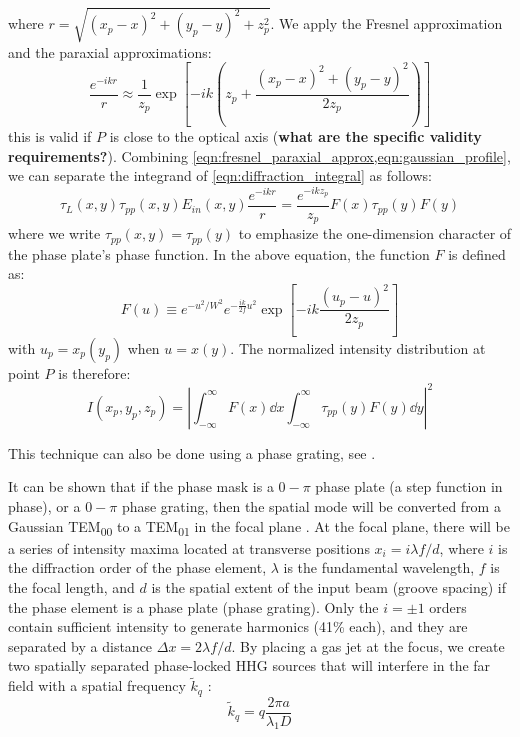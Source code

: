 where $r = \sqrt{(x_p-x)^2 + (y_p-y)^2 + z_p^2}$. We apply the Fresnel approximation and the paraxial approximations:
\begin{equation}
\frac{e^{-i k r}}{r} \approx \frac{1}{z_p} \exp \left[-ik \left(z_p + \frac{(x_p-x)^2 + (y_p-y)^2}{2z_p} \right) \right]
\label{eqn:fresnel_paraxial_approx}
\end{equation}
this is valid if $P$ is close to the optical axis (\textbf{what are the specific validity requirements?}). Combining \cref{eqn:fresnel_paraxial_approx,eqn:gaussian_profile}, we can separate the integrand of \cref{eqn:diffraction_integral} as follows:
\begin{equation}
\tau_{L}(x,y) \tau_{pp}(x,y) E_{in}(x,y) \frac{e^{-ikr}}{r} = \frac{e^{-ikz_p}}{z_p} F(x) \tau_{pp}(y) F(y)
\end{equation}
where we write ${\tau_{pp}(x,y)=\tau_{pp}(y)}$ to emphasize the one-dimension character of the phase plate's phase function. In the above equation, the function $F$ is defined as:
\begin{equation}
F(u) \equiv e^{-u^2/W^2}  e^{-\frac{ik}{2f}u^2} \exp \left[-ik \frac{(u_p-u)^2}{2 z_p}\right] 
\end{equation}
with $u_p = x_p (y_p)$ when $u = x (y)$. The normalized intensity distribution at point $P$ is therefore:
\begin{equation}
I(x_p, y_p, z_p) = \left| \int_{-\infty}^{\infty} F(x) \dd{x} \int_{-\infty}^{\infty} \tau_{pp}(y) F(y) \dd{y} \right|^2
\end{equation}



This technique can also be done using a phase grating, see \cite{hagemanComplexAttosecondTransientAbsorption2020}.

It can be shown that if the phase mask is a $0-\pi$ phase plate (a step function in phase), or a $0-\pi$ phase grating, then the spatial mode will be converted from a Gaussian TEM\textsubscript{00} to a TEM\textsubscript{01} in the focal plane \cite{hagemanComplexAttosecondTransientAbsorption2020,camperHighRelativephasePrecision2019,camperTransverseElectromagneticMode2015,camperHighharmonicPhaseSpectroscopy2014,camperCombinedHighharmonicInterferometries2015}. At the focal plane, there will be a series of intensity maxima located at transverse positions $x_i = i \lambda f / d$, where $i$ is the diffraction order of the phase element, $\lambda$ is the fundamental wavelength, $f$ is the focal length, and $d$ is the spatial extent of the input beam (groove spacing) if the phase element is a phase plate (phase grating). Only the $i = \pm 1$ orders contain sufficient intensity to generate harmonics (41\% each), and they are separated by a distance $\Delta x = 2 \lambda f / d$. By placing a gas jet at the focus, we create two spatially separated phase-locked HHG sources that will interfere in the far field with a spatial frequency $\tilde{k}_q$  \cite{camperTransverseElectromagneticMode2015}:
\begin{equation}
\tilde{k}_q = q \frac{2 \pi a}{\lambda_1 D}
\end{equation}

